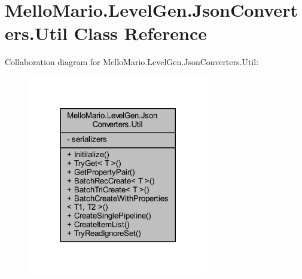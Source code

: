 \section{Mello\+Mario.\+Level\+Gen.\+Json\+Converters.\+Util Class Reference}
\label{classMelloMario_1_1LevelGen_1_1JsonConverters_1_1Util}


Collaboration diagram for Mello\+Mario.\+Level\+Gen.\+Json\+Converters.\+Util\+:
\nopagebreak
\begin{figure}[H]
\begin{center}
\leavevmode
\includegraphics[width=224pt]{classMelloMario_1_1LevelGen_1_1JsonConverters_1_1Util__coll__graph}
\end{center}
\end{figure}
